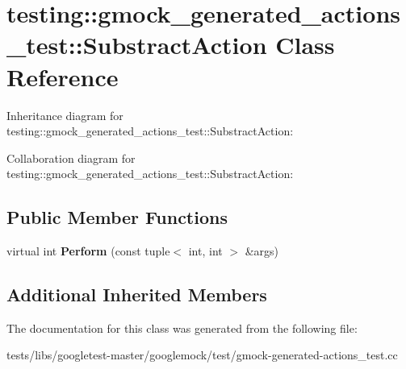 \hypertarget{classtesting_1_1gmock__generated__actions__test_1_1SubstractAction}{}\section{testing\+:\+:gmock\+\_\+generated\+\_\+actions\+\_\+test\+:\+:Substract\+Action Class Reference}
\label{classtesting_1_1gmock__generated__actions__test_1_1SubstractAction}


Inheritance diagram for testing\+:\+:gmock\+\_\+generated\+\_\+actions\+\_\+test\+:\+:Substract\+Action\+:


Collaboration diagram for testing\+:\+:gmock\+\_\+generated\+\_\+actions\+\_\+test\+:\+:Substract\+Action\+:
\subsection*{Public Member Functions}
\begin{DoxyCompactItemize}
\item 
\mbox{\label{classtesting_1_1gmock__generated__actions__test_1_1SubstractAction_ac049ec6196668e17ef7384e08914f2c3}} 
virtual int {\bfseries Perform} (const tuple$<$ int, int $>$ \&args)
\end{DoxyCompactItemize}
\subsection*{Additional Inherited Members}


The documentation for this class was generated from the following file\+:\begin{DoxyCompactItemize}
\item 
tests/libs/googletest-\/master/googlemock/test/gmock-\/generated-\/actions\+\_\+test.\+cc\end{DoxyCompactItemize}
